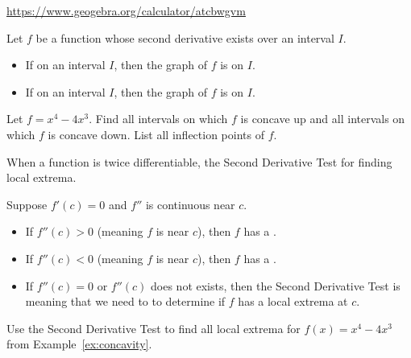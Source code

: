 \documentclass[../main.tex]{subfiles}
\begin{document}
  \begin{center}
    
    \hfill
    
    \hfill
    

    \url{https://www.geogebra.org/calculator/atcbwgvm}
  \end{center}

  \begin{mdframed}[style=withref-compact]
    Let \(f\) be a function whose second derivative exists over an interval \(I\).
    \begin{itemize}
      \item If \underline{\hspace{1in}} on an interval \(I\), then the graph of \(f\) is  on \(I\).
      \item If \underline{\hspace{1in}} on an interval \(I\), then the graph of \(f\) is  on \(I\).
    \end{itemize}

  \end{mdframed}

  \begin{example} \label{ex:concavity}
    Let \(f = x^{4} - 4x^{3}\). Find all intervals on which \(f\) is concave up and all intervals on which \(f\) is concave down. List all inflection points of \(f\).

  \end{example}

  \clearpage

  When a function is twice differentiable, the Second Derivative Test  for finding local extrema.

  \begin{mdframed}[style=withref-compact]
    Suppose \(f'(c) = 0\) and \(f''\) is continuous near \(c\).
    \begin{itemize}
      \item If \(f''(c) > 0\) (meaning \(f\) is \underline{\phantom{concave down}} near \(c\)), then \(f\) has a \underline{\hspace{1in}}.
      \item If \(f''(c) < 0\) (meaning \(f\) is \underline{\phantom{concave down}} near \(c\)), then \(f\) has a \underline{\hspace{1in}}.
      \item[\faExclamationTriangle{}] If \(f''(c) = 0\) or \(f''(c)\) does not exists, then the Second Derivative Test is  meaning that we need to  to determine if \(f\) has a local extrema at \(c\).
    \end{itemize}

  \end{mdframed}

  \begin{example}
    Use the Second Derivative Test to find all local extrema for \(f(x) = x^{4} - 4x^{3}\) from Example~\ref{ex:concavity}.
  \end{example}
  \vfill
\end{document}
